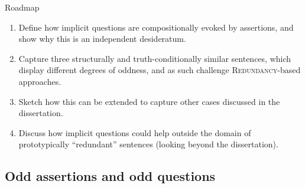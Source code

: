 \documentclass[10pt]{beamer}
\begin{document}
\begin{frame}{Roadmap}
	\begin{enumerate}
		\item Define how implicit questions are compositionally evoked by assertions, and show why this is an independent desideratum.
		\item Capture three structurally and truth-conditionally similar sentences, which display different degrees of oddness, and as such challenge \textsc{Redundancy}-based approaches.
		\item Sketch how this can be extended to capture other cases discussed in the dissertation.
		\item Discuss how implicit questions could help outside the domain of prototypically ``redundant'' sentences (looking beyond the dissertation).
	\end{enumerate}
\end{frame}

\begin{frame}
	\section[Odd assertions and odd questions]{Odd assertions and odd questions}
\end{frame}

\usebackgroundtemplate{}
\end{document}
